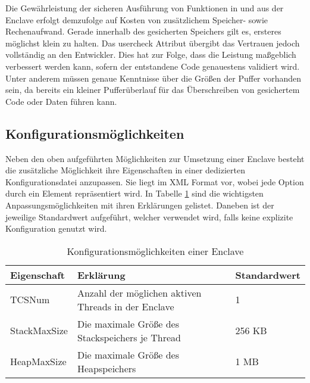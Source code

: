 Die Gewährleistung der sicheren Ausführung von Funktionen in und aus der Enclave erfolgt demzufolge auf Kosten von zusätzlichem Speicher- sowie Rechenaufwand. Gerade innerhalb des gesicherten Speichers gilt es, ersteres möglichst klein zu halten. Das user\textunderscore check Attribut übergibt das Vertrauen jedoch vollständig an den Entwickler. Dies hat zur Folge, dass die Leistung maßgeblich verbessert werden kann, sofern der entstandene Code genauestens validiert wird. Unter anderem müssen genaue Kenntnisse über die Größen der Puffer vorhanden sein, da bereits ein kleiner Pufferüberlauf für das Überschreiben von gesichertem Code oder Daten führen kann.


%	
%	

\subsection{Konfigurationsmöglichkeiten}

Neben den oben aufgeführten Möglichkeiten zur Umsetzung einer Enclave besteht die zusätzliche Möglichkeit ihre Eigenschaften in einer dedizierten Konfigurationsdatei anzupassen. Sie liegt im XML Format vor, wobei jede Option durch ein Element repräsentiert wird. In Tabelle \ref{tab:sgxconfig} sind die wichtigsten Anpassungsmöglichkeiten mit ihren Erklärungen gelistet. Daneben ist der jeweilige Standardwert aufgeführt, welcher verwendet wird, falls keine explizite Konfiguration genutzt wird.

\begin{table}[h]
	\centering
	\begin{tabular}{|l|l|l|}
		\hline
		\textbf{Eigenschaft} & \textbf{Erklärung} & \textbf{Standardwert} \\
		\hline
		TCSNum & Anzahl der möglichen aktiven Threads in der Enclave & 1 \\
		\hline
		StackMaxSize & Die maximale Größe des Stackspeichers je Thread & 256 KB \\
		\hline
		HeapMaxSize & Die maximale Größe des Heapspeichers & 1 MB \\
		\hline
	\end{tabular}
	\caption{Konfigurationsmöglichkeiten einer Enclave}
	\label{tab:sgxconfig}
\end{table}

